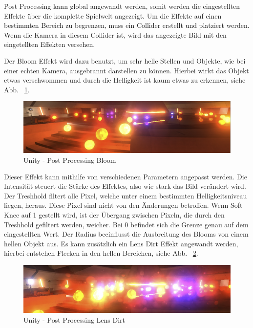 Post Processing kann global angewandt werden, somit werden die eingestellten Effekte \"uber die komplette Spielwelt angezeigt.
Um die Effekte auf einen bestimmten Bereich zu begrenzen, muss ein Collider erstellt und platziert werden.
Wenn die Kamera in diesem Collider ist, wird das angezeigte Bild mit den eingetellten Effekten versehen.
~\cite{Unity_Post_Processing_Volumes_2022}

Der Bloom Effekt wird dazu benutzt, um sehr helle Stellen und Objekte, wie bei einer echten Kamera, ausgebrannt darstellen zu können.
Hierbei wirkt das Objekt etwas verschwommen und durch die Helligkeit ist kaum etwas zu erkennen, siehe Abb. ~\ref{fig:unity-post-processing-bloom}.
\begin {figure}
    \centering
    \includegraphics[scale=0.9]{pics/unity-post-processing-bloom}
    \caption{Unity - Post Processing Bloom}
    \label{fig:unity-post-processing-bloom}
\end {figure}
Dieser Effekt kann mithilfe von verschiedenen Parametern angepasst werden.
Die Intensität steuert die Stärke des Effektes, also wie stark das Bild verändert wird.
Der Treshhold filtert alle Pixel, welche unter einem bestimmten Helligkeitsniveau liegen, heraus.
Diese Pixel sind nicht von den Änderungen betroffen.
Wenn Soft Knee auf 1 gestellt wird, ist der Übergang zwischen Pixeln, die durch den Treshhold gefiltert werden, weicher.
Bei 0 befindet sich die Grenze genau auf dem eingestellten Wert.
Der Radius beeinflusst die Ausbreitung des Blooms von einem hellen Objekt aus.
Es kann zusätzlich ein Lens Dirt Effekt angewandt werden, hierbei entstehen Flecken in den hellen Bereichen, siehe Abb. ~\ref{fig:unity-post-processing-lens-dirt}.
~\cite{Unity_Post_Processing_Bloom_2022}

\begin {figure}
    \centering
    \includegraphics[scale=0.9]{pics/unity-post-processing-lens-dirt}
    \caption{Unity - Post Processing Lens Dirt}
    \label{fig:unity-post-processing-lens-dirt}
\end {figure}

